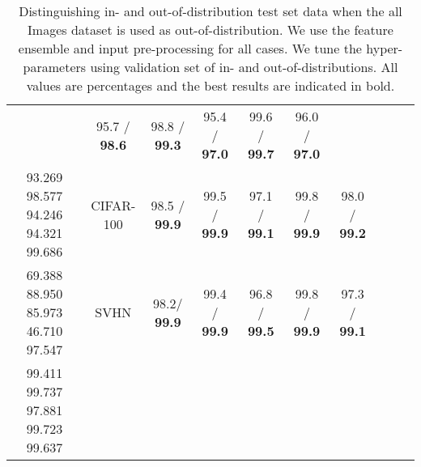 \documentclass{article}
\begin{document}
\begin{table}[h]
{\begin{tabular}{@{}ccclclclll@{}}
& \multicolumn{1}{c}{ 95.7 / {\bf 98.6}}& \multicolumn{1}{c}{ 98.8 / {\bf 99.3}}& \multicolumn{1}{c}{ 95.4 / {\bf 97.0}}& \multicolumn{1}{c}{ 99.6  / {\bf 99.7}}& \multicolumn{1}{c}{ 96.0 / {\bf 97.0}}\\
93.269 98.577 94.246 94.321 99.686
& \multicolumn{1}{c}{CIFAR-100} 
& \multicolumn{1}{c}{ 98.5 / {\bf 99.9}}& \multicolumn{1}{c}{ 99.5 / {\bf 99.9}}& \multicolumn{1}{c}{ 97.1 / {\bf 99.1}}& \multicolumn{1}{c}{  99.8 / {\bf 99.9}}& \multicolumn{1}{c}{ 98.0 / {\bf 99.2}}\\
69.388 88.950 85.973 46.710 97.547
& \multicolumn{1}{c}{SVHN} 
& \multicolumn{1}{c}{  98.2/ {\bf 99.9}}& \multicolumn{1}{c}{ 99.4 / {\bf 99.9}}& \multicolumn{1}{c}{ 96.8 / {\bf 99.5}}& \multicolumn{1}{c}{ 99.8 / {\bf 99.9}}& \multicolumn{1}{c}{ 97.3 / {\bf 99.1}}\\ 
99.411 99.737 97.881 99.723 99.637
\bottomrule
\end{tabular}}
\vspace{+0.02in}
\caption{
Distinguishing in- and out-of-distribution test set data when the all Images dataset is used as out-of-distribution.
We use the feature ensemble and input pre-processing for all cases. We tune the hyper-parameters using validation set of in- and out-of-distributions. All values are percentages and the best results are indicated in bold.}
\label{tbl:ED_vs_Ours}
\end{table}
\fi
\end{document}
